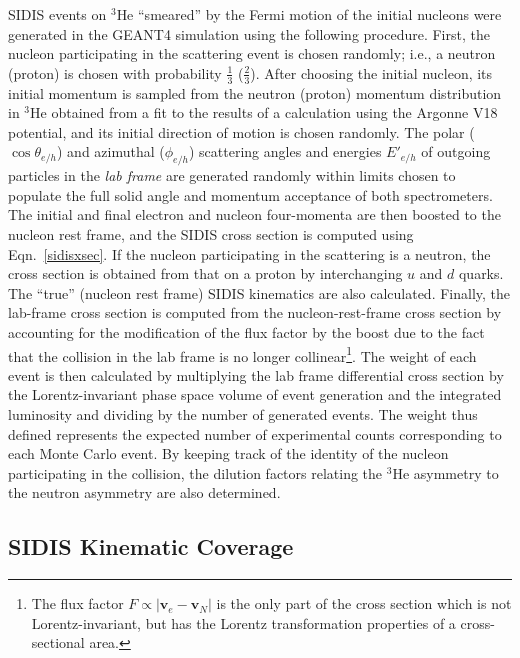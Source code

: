 SIDIS events on $^3$He ``smeared'' by the Fermi motion of the initial nucleons were generated in the GEANT4 simulation using the following procedure. First, the nucleon participating in the scattering event is chosen randomly; i.e., a neutron (proton) is chosen with probability $\frac{1}{3}$ ($\frac{2}{3}$). After choosing the initial nucleon, its initial momentum is sampled from the neutron (proton) momentum distribution in $^3$He obtained from a fit to the results of a calculation using the Argonne V18 potential, and its initial direction of motion is chosen randomly. The polar ($\cos \theta_{e/h}$) and azimuthal ($\phi_{e/h}$) scattering angles and energies $E'_{e/h}$ of outgoing particles in the \emph{lab frame} are generated randomly within limits chosen to populate the full solid angle and momentum acceptance of both spectrometers. The initial and final electron and nucleon four-momenta are then boosted to the nucleon rest frame, and the SIDIS cross section is computed using Eqn.~\eqref{sidisxsec}. If the nucleon participating in the scattering is a neutron, the cross section is obtained from that on a proton by interchanging $u$ and $d$ quarks. The ``true'' (nucleon rest frame) SIDIS kinematics are also calculated. Finally, the lab-frame cross section is computed from the nucleon-rest-frame cross section by accounting for the modification of the flux factor by the boost due to the fact that the collision in the lab frame is no longer collinear\footnote{The flux factor $F \propto \left| \mathbf{v}_e - \mathbf{v}_N\right|$ is the only part of the cross section which is not Lorentz-invariant, but has the Lorentz transformation properties of a cross-sectional area.}. The weight of each event is then calculated by multiplying the lab frame differential cross section by the Lorentz-invariant phase space volume of event generation and the integrated luminosity and dividing by the number of generated events. The weight thus defined represents the expected number of experimental counts corresponding to each Monte Carlo event. By keeping track of the identity of the nucleon participating in the collision, the dilution factors relating the $^3$He asymmetry to the neutron asymmetry are also determined. 
\subsection{SIDIS Kinematic Coverage}
